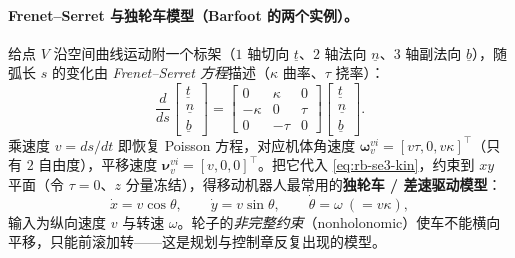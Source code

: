 \paragraph{Frenet--Serret 与独轮车模型（Barfoot 的两个实例）。}给点 $V$ 沿空间曲线运动附一个标架（$1$ 轴切向 $\underline{t}$、$2$ 轴法向 $\underline{n}$、$3$ 轴副法向 $\underline{b}$），随弧长 $s$ 的变化由 \emph{Frenet--Serret 方程}描述（$\kappa$ 曲率、$\tau$ 挠率）：
\begin{equation}
  \frac{d}{ds}\begin{bmatrix}\underline{t}\\\underline{n}\\\underline{b}\end{bmatrix}
  =\begin{bmatrix}0&\kappa&0\\-\kappa&0&\tau\\0&-\tau&0\end{bmatrix}\begin{bmatrix}\underline{t}\\\underline{n}\\\underline{b}\end{bmatrix}.
\end{equation}
乘速度 $v=ds/dt$ 即恢复 Poisson 方程，对应机体角速度 $\boldsymbol{\omega}_v^{vi}=[v\tau,0,v\kappa]^\top$（只有 $2$ 自由度），平移速度 $\boldsymbol{\nu}_v^{vi}=[v,0,0]^\top$。把它代入 \cref{eq:rb-se3-kin}，约束到 $xy$ 平面（令 $\tau=0$、$z$ 分量冻结），得移动机器人最常用的\textbf{独轮车 / 差速驱动模型}：
\begin{equation}
  \dot{x}=v\cos\theta,\qquad \dot{y}=v\sin\theta,\qquad \dot{\theta}=\omega\ (=v\kappa),
  \label{eq:rb-unicycle}
\end{equation}
输入为纵向速度 $v$ 与转速 $\omega$。轮子的\emph{非完整约束}（nonholonomic）使车不能横向平移，只能前滚加转——这是规划与控制章反复出现的模型\cite{barfoot2024state}。

